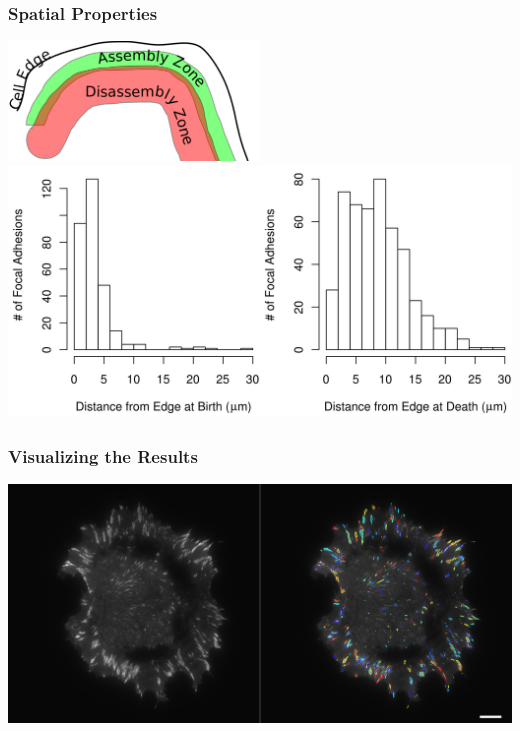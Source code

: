 \documentclass{beamer}
\begin{document}
\begin{frame}
	\frametitle{Spatial Properties}
	\begin{center}
	\includegraphics[width=0.5\textwidth]{figures/analysis/spacial_cartoon.png}
	\\
	\includegraphics[width=\textwidth]{figures/analysis/spatial.png}
	\end{center}
\end{frame}

\begin{frame}
	\frametitle{Visualizing the Results}
	\begin{center}
	\includegraphics[width=\textwidth]{figures/analysis/visualize_frame}
	\end{center}
\end{frame}
\end{document}
